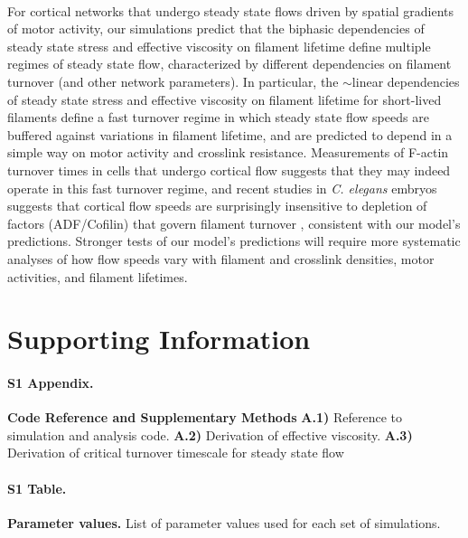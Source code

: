 \documentclass[10pt,letterpaper]{article}
\begin{document}
\paragraph{} For cortical networks that undergo steady state flows driven by spatial gradients of motor activity, our simulations predict that the biphasic dependencies of steady state stress and effective viscosity on filament lifetime define multiple regimes of steady state flow, characterized by different dependencies on filament turnover (and other network parameters).  In particular, the $\sim$linear dependencies of steady state stress and effective viscosity on filament lifetime for short-lived filaments define a fast turnover regime in which steady state flow speeds are buffered against variations in filament lifetime, and are predicted to depend in a simple way on motor activity and crosslink resistance.  Measurements of F-actin turnover times in cells that undergo cortical flow \cite{Theriot1991,Murthy2016,Watanabe1083,Guha2016,Fritzsche15032013,Robin:2014aa} suggests that they may indeed operate in this fast turnover regime, and recent studies in {\em C. elegans} embryos suggests that cortical flow speeds are surprisingly insensitive to depletion of factors (ADF/Cofilin) that govern filament turnover \cite{cellmech_flows}, consistent with our model's predictions. Stronger tests of our model's predictions will require more systematic analyses of how flow speeds vary with filament and crosslink densities, motor activities, and filament lifetimes.

\section*{Supporting Information}


\paragraph*{S1 Appendix.}
\label{S1_Text}
{\bf Code Reference and Supplementary Methods}  \textbf{A.1)} Reference to simulation and analysis code. \textbf{A.2)} Derivation of effective viscosity. \textbf{A.3)} Derivation of critical turnover timescale for steady state flow

\paragraph*{S1 Table.}
\label{S1_Table}
{\bf Parameter values.}  List of parameter values used for each set of simulations.
\end{document}
